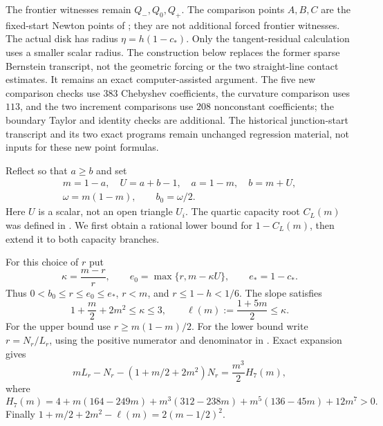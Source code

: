 The frontier witnesses remain $Q_-,Q_0,Q_+$.  The comparison points $A,B,C$
are the fixed-start Newton points of
; they are not additional forced
frontier witnesses.  The actual disk has radius $\eta=h(1-c_*)$.
Only the tangent-residual calculation uses a smaller scalar radius.
The construction below replaces the former sparse Bernstein transcript,
not the geometric forcing or the two straight-line contact estimates.
It remains an exact computer-assisted argument.
The five new comparison checks use $383$ Chebyshev coefficients, the curvature
comparison uses $113$, and the two increment comparisons use $208$ nonconstant
coefficients; the boundary Taylor and identity checks are additional.
The historical junction-start transcript and its two exact programs remain
unchanged regression material, not inputs for these new point formulas.


Reflect so that $a\ge b$ and set
\[
 \begin{gathered}
 m=1-a,\quad U=a+b-1,\quad a=1-m,\quad b=m+U,\\
 \omega=m(1-m),\qquad b_0=\omega/2.
 \end{gathered}
\]
Here $U$ is a scalar, not an open triangle $U_i$.
The quartic capacity root $C_L(m)$ was defined in
.  We first obtain a rational lower bound for
$1-C_L(m)$, then extend it to both capacity branches.



For this choice of $r$ put
\begin{equation}
 \kappa=\frac{m-r}{r},\qquad
 e_0=\max\{r,m-\kappa U\},\qquad e_*=1-c_*.
 \label{eq:f-uniform-radius}
\end{equation}
Thus $0<b_0\le r\le e_0\le e_*$, $r<m$, and $r\le1-h<1/6$.
The slope satisfies
\begin{equation}
 1+\frac m2+2m^2\le\kappa\le3,
 \qquad \ell(m):=\frac{1+5m}{2}\le\kappa.
 \label{eq:f-slope-bounds}
\end{equation}
For the upper bound use $r\ge m(1-m)/2$.  For the lower bound write
$r=N_r/L_r$, using the positive numerator and denominator in
.  Exact expansion gives
\[
 mL_r-N_r-(1+m/2+2m^2)N_r=\frac{m^3}{2}H_7(m),
\]
where
\[
 H_7(m)=4+m(164-249m)+m^3(312-238m)
            +m^5(136-45m)+12m^7>0.
\]
Finally $1+m/2+2m^2-\ell(m)=2(m-1/2)^2$.

